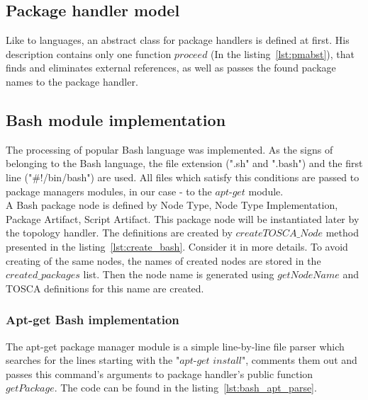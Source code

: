 \subsection*{Package handler model}
Like to languages, an abstract class for package handlers is defined at first.
His description contains only one function $proceed$ (In the listing~\ref{lst:pmabst}), that finds and eliminates external references, as well as passes the found package names to the package handler.

\subsection*{Bash module implementation}
The processing of popular Bash language was implemented.
As the signs of belonging to the Bash language, the file extension (".sh" and ".bash") and the first line ("\#!/bin/bash") are used. 
All files which satisfy this conditions are passed to package managers modules, in our case - to the $apt$-$get$ module. \\
A Bash package node is defined by Node Type, Node Type Implementation, Package Artifact, Script Artifact.
This package node will be instantiated later by the topology handler.
The definitions are created by $createTOSCA\_Node$ method presented in the listing~\ref{lst:create_bash}.
Consider it in more details.
To avoid creating of the same nodes, the names of created nodes are stored in the $created\_packages$ list.
Then the node name is generated using $getNodeName$ and TOSCA definitions for this name are created.

\subsubsection*{Apt-get Bash implementation}
The apt-get package manager module is a simple line-by-line file parser which searches for the lines starting with the "$apt$-$get$ $install$", comments them out and passes this command's arguments to package handler's public function $getPackage$. 
The code can be found in the listing~\ref{lst:bash_apt_parse}.
